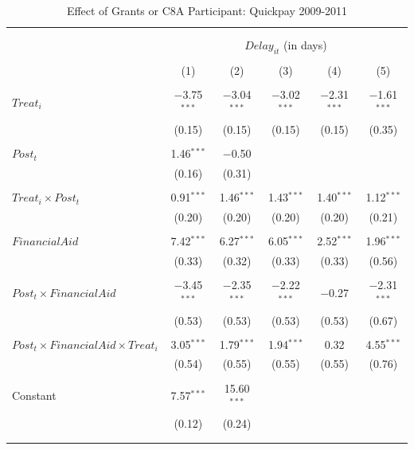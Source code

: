 \documentclass[
]{article}
\begin{document}
\begin{table}[H] \centering 
  \caption{Effect of Grants or C8A Participant: Quickpay 2009-2011} 
  \label{} 
\small 
\begin{tabular}{@{\extracolsep{-2pt}}lccccc} 
\\[-1.8ex]\hline 
\hline \\[-1.8ex] 
\\[-1.8ex] & \multicolumn{5}{c}{$Delay_{it}$ (in days)} \\ 
\\[-1.8ex] & (1) & (2) & (3) & (4) & (5)\\ 
\hline \\[-1.8ex] 
 $Treat_i$ & $-$3.75$^{***}$ & $-$3.04$^{***}$ & $-$3.02$^{***}$ & $-$2.31$^{***}$ & $-$1.61$^{***}$ \\ 
  & (0.15) & (0.15) & (0.15) & (0.15) & (0.35) \\ 
  & & & & & \\ 
 $Post_t$ & 1.46$^{***}$ & $-$0.50 &  &  &  \\ 
  & (0.16) & (0.31) &  &  &  \\ 
  & & & & & \\ 
 $Treat_i \times Post_t$ & 0.91$^{***}$ & 1.46$^{***}$ & 1.43$^{***}$ & 1.40$^{***}$ & 1.12$^{***}$ \\ 
  & (0.20) & (0.20) & (0.20) & (0.20) & (0.21) \\ 
  & & & & & \\ 
 $FinancialAid$ & 7.42$^{***}$ & 6.27$^{***}$ & 6.05$^{***}$ & 2.52$^{***}$ & 1.96$^{***}$ \\ 
  & (0.33) & (0.32) & (0.33) & (0.33) & (0.56) \\ 
  & & & & & \\ 
 $Post_t \times FinancialAid$ & $-$3.45$^{***}$ & $-$2.35$^{***}$ & $-$2.22$^{***}$ & $-$0.27 & $-$2.31$^{***}$ \\ 
  & (0.53) & (0.53) & (0.53) & (0.53) & (0.67) \\ 
  & & & & & \\ 
 $Post_t \times FinancialAid \times Treat_i$ & 3.05$^{***}$ & 1.79$^{***}$ & 1.94$^{***}$ & 0.32 & 4.55$^{***}$ \\ 
  & (0.54) & (0.55) & (0.55) & (0.55) & (0.76) \\ 
  & & & & & \\ 
 Constant & 7.57$^{***}$ & 15.60$^{***}$ &  &  &  \\ 
  & (0.12) & (0.24) &  &  &  \\ 
  & & & & & \\ 
\hline \\[-1.8ex] 

\end{tabular}
\end{table}
\end{document}
